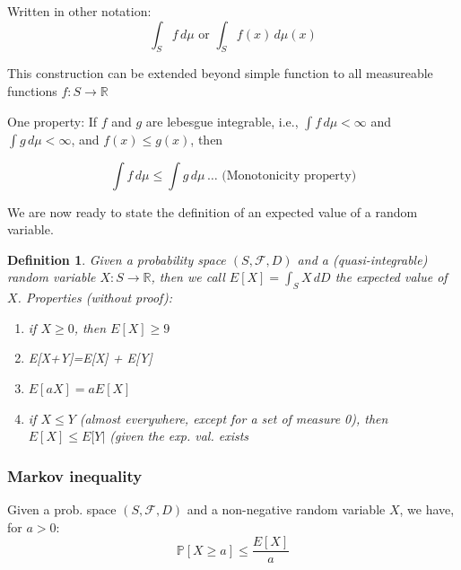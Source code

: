 \documentclass{scrarticle}
\newtheorem{definition}{Definition}[section]
\begin{document}
Written in other notation: 
\begin{equation*}
    \int_S f \, d\mu \text{ or } \int_S f(x) \, d\mu(x)
\end{equation*}

This construction can be extended beyond simple function to all measureable functions $f: S\to \mathbb{R}$

One property: If $f$ and $g$ are lebesgue integrable, i.e., $\int f\, d\mu < \infty$ and $\int g\, d\mu < \infty$, and $f(x) \leq g(x)$, then 

\begin{equation*}
    \int f \, d\mu \leq \int g \, d\mu \, \ldots\text{ (Monotonicity property)}
\end{equation*}

We are now ready to state the definition of an expected value of a random variable. 

\begin{definition}
    Given a probability space $(S, \mathcal{F}, D)$ and a (quasi-integrable) random variable $X: S \to \mathbb{R}$, then we call $E[X]=\int_SX\,dD$ the expected value of $X$.
    Properties (without proof):
    \begin{enumerate}
        \item if $X\geq0$, then $E[X]\geq 9$
        \item E[X+Y]=E[X] + E[Y]
        \item $E[aX] = a E[X]$
        \item if $X\leq Y$ (almost everywhere, except for a set of measure 0), then $E[X] \leq E[Y|$ (given the exp. val. exists
    \end{enumerate}
\end{definition}

\subsubsection{Markov inequality}
Given a prob. space $(S,\mathcal{F}, D)$ and a non-negative random variable $X$, we have, for $a>0$:
\begin{equation*}
    \mathbb{P}[X\geq a]\leq \frac{E[X]}{a}
\end{equation*}
\end{document}
